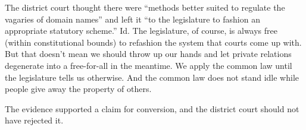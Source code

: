 The district court thought there were ``methods better suited to regulate the
vagaries of domain names'' and left it ``to the legislature to fashion an
appropriate statutory scheme.'' Id. The legislature, of course, is always free
(within constitutional bounds) to refashion the system that courts come up
with. But that doesn't mean we should throw up our hands and let private
relations degenerate into a free-for-all in the meantime. We apply the common
law until the legislature tells us otherwise. And the common law does not stand
idle while people give away the property of others.

The evidence supported a claim for conversion, and the district court should not
have rejected it.

